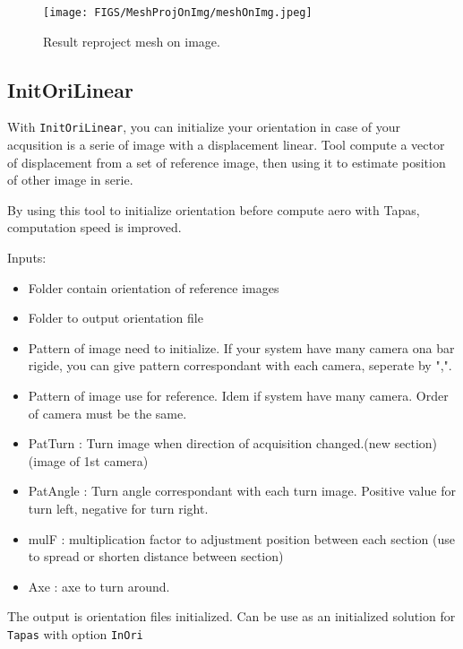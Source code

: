 \begin{figure}[H]
\centering
\texttt{[image: FIGS/MeshProjOnImg/meshOnImg.jpeg]}
\caption{Result reproject mesh on image.}
\label{SurfCorr}
\end{figure}

\subsection{InitOriLinear}

With {\tt InitOriLinear}, you can initialize your orientation in case of your acqusition is a serie of image with a displacement linear. Tool compute a vector of displacement from a set of reference image, then using it to estimate position of other image in serie.

By using this tool to initialize orientation before compute aero with Tapas, computation speed is improved.

Inputs:
\begin{itemize}
\item Folder contain orientation of reference images
\item Folder to output orientation file
\item Pattern of image need to initialize. If your system have many camera ona bar rigide, you can give pattern correspondant with each camera, seperate by ",".
\item Pattern of image use for reference. Idem if system have many camera. Order of camera must be the same.

\item PatTurn : Turn image when direction of acquisition changed.(new section) (image of 1st camera)
\item PatAngle : Turn angle correspondant with each turn image. Positive value for turn left, negative for turn right.
\item mulF : multiplication factor to adjustment position between each section (use to spread or shorten distance between section)
\item Axe : axe to turn around.
\end{itemize}

The output is orientation files initialized. Can be use as an initialized solution for {\tt Tapas} with option {\tt InOri}


